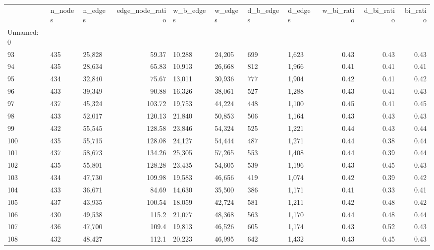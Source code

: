 \begin{tabular}{lllrllllrrr}
\toprule
{} & n\_nodes & n\_edges &  edge\_node\_ratio & w\_b\_edges & w\_edges & d\_b\_edges & d\_edges &  w\_bi\_ratio &  d\_bi\_ratio &  bi\_ratio \\
Unnamed: 0 &         &         &                  &           &         &           &         &             &             &           \\
\midrule
93         &     435 &  25,828 &            59.37 &    10,288 &  24,205 &       699 &   1,623 &        0.43 &        0.43 &      0.43 \\
94         &     435 &  28,634 &            65.83 &    10,913 &  26,668 &       812 &   1,966 &        0.41 &        0.41 &      0.41 \\
95         &     434 &  32,840 &            75.67 &    13,011 &  30,936 &       777 &   1,904 &        0.42 &        0.41 &      0.42 \\
96         &     433 &  39,349 &            90.88 &    16,326 &  38,061 &       527 &   1,288 &        0.43 &        0.41 &      0.43 \\
97         &     437 &  45,324 &           103.72 &    19,753 &  44,224 &       448 &   1,100 &        0.45 &        0.41 &      0.45 \\
98         &     433 &  52,017 &           120.13 &    21,840 &  50,853 &       506 &   1,164 &        0.43 &        0.43 &      0.43 \\
99         &     432 &  55,545 &           128.58 &    23,846 &  54,324 &       525 &   1,221 &        0.44 &        0.43 &      0.44 \\
100        &     435 &  55,715 &           128.08 &    24,127 &  54,444 &       487 &   1,271 &        0.44 &        0.38 &      0.44 \\
101        &     437 &  58,673 &           134.26 &    25,305 &  57,265 &       553 &   1,408 &        0.44 &        0.39 &      0.44 \\
102        &     435 &  55,801 &           128.28 &    23,435 &  54,605 &       539 &   1,196 &        0.43 &        0.45 &      0.43 \\
103        &     434 &  47,730 &           109.98 &    19,583 &  46,656 &       419 &   1,074 &        0.42 &        0.39 &      0.42 \\
104        &     433 &  36,671 &            84.69 &    14,630 &  35,500 &       386 &   1,171 &        0.41 &        0.33 &      0.41 \\
105        &     437 &  43,935 &           100.54 &    18,059 &  42,724 &       581 &   1,211 &        0.42 &        0.48 &      0.42 \\
106        &     430 &  49,538 &            115.2 &    21,077 &  48,368 &       563 &   1,170 &        0.44 &        0.48 &      0.44 \\
107        &     436 &  47,700 &            109.4 &    19,813 &  46,526 &       605 &   1,174 &        0.43 &        0.52 &      0.43 \\
108        &     432 &  48,427 &            112.1 &    20,223 &  46,995 &       642 &   1,432 &        0.43 &        0.45 &      0.43 \\
\bottomrule
\end{tabular}
